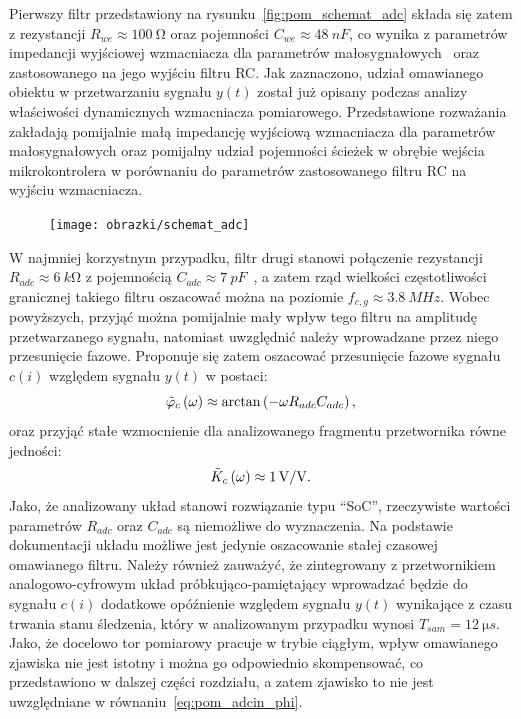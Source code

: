 Pierwszy filtr przedstawiony na rysunku~\ref{fig:pom_schemat_adc} składa się zatem z rezystancji $R_{we} \approx \qty{100}{\ohm}$ oraz pojemności $C_{we} \approx \qty{48}{nF}$, co wynika z parametrów impedancji wyjściowej wzmacniacza dla parametrów małosygnałowych~\cite{microchip_application} oraz zastosowanego na jego wyjściu filtru RC. Jak zaznaczono, udział omawianego obiektu w przetwarzaniu sygnału $y(t)$ został już opisany podczas analizy właściwości dynamicznych wzmacniacza pomiarowego. Przedstawione rozważania zakładają pomijalnie małą impedancję wyjściową wzmacniacza dla parametrów małosygnałowych oraz pomijalny udział pojemności ścieżek w obrębie wejścia mikrokontrolera w porównaniu do parametrów zastosowanego filtru RC na wyjściu wzmacniacza.

\begin{figure}[htb!]
\begin{center}
\texttt{[image: obrazki/schemat\_adc]}
\end{center}
\end{figure}

W najmniej korzystnym przypadku, filtr drugi stanowi połączenie rezystancji $R_{adc} \approx \qty{6}{k \ohm}$ z pojemnością $C_{adc} \approx \qty{7}{pF}$~\cite{stm_f411}, a zatem rząd wielkości częstotliwości granicznej takiego filtru oszacować można na poziomie $f_{c,g} \approx \qty{3.8}{MHz}$. Wobec powyższych, przyjąć można pomijalnie mały wpływ tego filtru na amplitudę przetwarzanego sygnału, natomiast uwzględnić należy wprowadzane przez niego przesunięcie fazowe. Proponuje się zatem oszacować przesunięcie fazowe sygnału $c(i)$ względem sygnału $y(t)$ w postaci:
\begin{equation}
\tilde{\varphi}_{c} \left(\omega\right) \approx \arctan \left(-\omega R_{adc} C_{adc}\right) \label{eq:pom_adcin_phi},
\end{equation}
oraz przyjąć stałe wzmocnienie dla analizowanego fragmentu przetwornika równe jedności:
\begin{equation}
\tilde{K}_{c} \left(\omega\right) \approx \qty{1}{V \per V} \label{eq:pom_adcin_amp}.
\end{equation}
Jako, że analizowany układ stanowi rozwiązanie typu \enquote{SoC}, rzeczywiste wartości parametrów $R_{adc}$ oraz $C_{adc}$ są niemożliwe do wyznaczenia. Na podstawie dokumentacji układu możliwe jest jedynie oszacowanie stałej czasowej omawianego filtru. Należy również zauważyć, że zintegrowany z przetwornikiem analogowo-cyfrowym układ próbkująco-pamiętający wprowadzać będzie do sygnału $c(i)$ dodatkowe opóźnienie względem sygnału $y(t)$ wynikające z czasu trwania stanu śledzenia, który w analizowanym przypadku wynosi $T_{sam} = \qty{12}{\micro s}$. Jako, że docelowo tor pomiarowy pracuje w trybie ciągłym, wpływ omawianego zjawiska nie jest istotny i można go odpowiednio skompensować, co przedstawiono w dalszej części rozdziału, a zatem zjawisko to nie jest uwzględniane w równaniu~\eqref{eq:pom_adcin_phi}.

